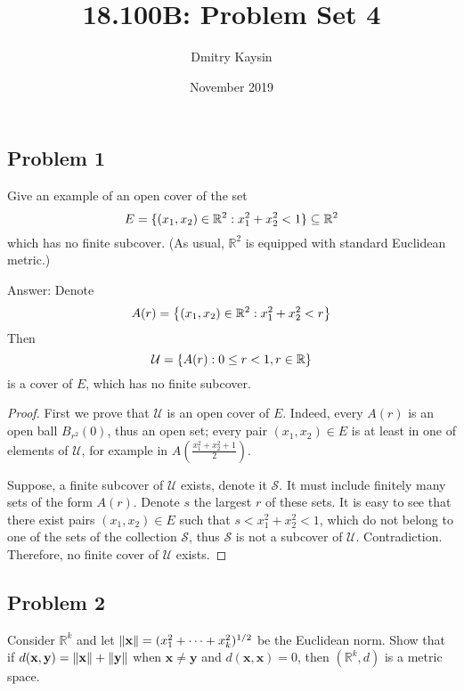 \documentclass{article}
\title{18.100B: Problem Set 4}
\author{Dmitry Kaysin}
\date{November 2019}
\newcommand{\R}{\mathbb{R}}
\newcommand{\vect}[1]{\mathbf{#1}}
\DeclarePairedDelimiter{\norm}{\lVert}{\rVert}
\DeclarePairedDelimiter{\set}{ \{ }{ \} }
\begin{document}
\maketitle 


\subsection*{Problem 1}

\begin{tcolorbox}
Give an example of an open cover of the set
\[ E = \set{ (x_1, x_2) \in \R^2 : x_1^2 + x_2^2 < 1 } \subseteq \R^2 \]
which has no finite subcover.
(As usual, $\R^2$ is equipped with standard Euclidean metric.)
\end{tcolorbox}

Answer: Denote 
\[ A(r) = \set*{ (x_1, x_2) \in \R^2 : x_1^2 + x_2^2 < r } \]
Then 
\[ \mathcal{U} = \set*{ A(r) : 0 \leq r < 1, r \in \R } \]
is a cover of $E$, which has no finite subcover.

\begin{proof}

First we prove that $\mathcal{U}$ is an open cover of $E$.
Indeed, every $A(r)$ is an open ball $B_{r^2}(0)$, thus an open set;
every pair $(x_1, x_2) \in E$ is at least in one of elements of $\mathcal{U}$, for example in $A(\frac{x_1^2+x_2^2+1}{2})$.

Suppose, a finite subcover of $\mathcal{U}$ exists, denote it $\mathcal{S}$.
It must include finitely many sets of the form $A(r)$.
Denote $s$ the largest $r$ of these sets. It is easy to see that there exist pairs $(x_1, x_2) \in E$ such that $s < x_1^2 + x_2^2 < 1$, which do not belong to one of the sets of the collection $\mathcal{S}$, thus $\mathcal{S}$ is not a subcover of $\mathcal{U}$.
Contradiction.
Therefore, no finite cover of $\mathcal{U}$ exists.

\end{proof}


\subsection*{Problem 2}

\begin{tcolorbox}
Consider $\R^k$ and let $\norm{ \vect{x} } = (x_1^2 + \dots + x_k^2)^{1/2}$ be the Euclidean norm.
Show that if $d(\vect{x}, \vect{y}) = \norm{ \vect{x} } + \norm{ \vect{y} }$ when $\vect{x} \neq \vect{y}$ and $d(\vect{x}, \vect{x}) = 0$, then $(\R^k, d)$ is a metric space.
\end{tcolorbox}
\end{document}
